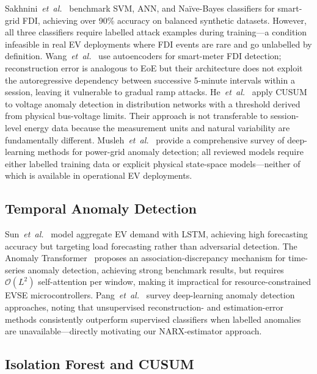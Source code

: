 \documentclass[journal]{IEEEtran}
\begin{document}
Sakhnini~\emph{et~al.}~\cite{sakhnini2019} benchmark SVM, ANN,
and Na\"ive-Bayes classifiers for smart-grid FDI, achieving over
90\% accuracy on balanced synthetic datasets.
However, all three classifiers require labelled attack examples
during training---a condition infeasible in real EV deployments
where FDI events are rare and go unlabelled by definition.
Wang~\emph{et~al.}~\cite{wang2020detection} use autoencoders for
smart-meter FDI detection; reconstruction error is analogous
to EoE but their architecture does not exploit the autoregressive
dependency between successive 5-minute intervals within a session,
leaving it vulnerable to gradual ramp attacks.
He~\emph{et~al.}~\cite{he2020cyber} apply CUSUM to voltage
anomaly detection in distribution networks with a threshold derived
from physical bus-voltage limits.
Their approach is not transferable to session-level energy data
because the measurement units and natural variability are
fundamentally different.
Musleh~\emph{et~al.}~\cite{musleh2019} provide a comprehensive
survey of deep-learning methods for power-grid anomaly detection;
all reviewed models require either labelled training data or
explicit physical state-space models---neither of which is
available in operational EV deployments.

\subsection{Temporal Anomaly Detection}

Sun~\emph{et~al.}~\cite{sun2020charging} model aggregate EV demand
with LSTM, achieving high forecasting accuracy but targeting
load forecasting rather than adversarial detection.
The Anomaly Transformer~\cite{xu2022anomaly} proposes an
association-discrepancy mechanism for time-series anomaly detection,
achieving strong benchmark results, but requires $\mathcal{O}(L^2)$
self-attention per window, making it impractical for resource-constrained
EVSE microcontrollers.
Pang~\emph{et~al.}~\cite{pang2021deep} survey deep-learning
anomaly detection approaches, noting that unsupervised reconstruction-
and estimation-error methods consistently outperform supervised
classifiers when labelled anomalies are unavailable---directly
motivating our NARX-estimator approach.

\subsection{Isolation Forest and CUSUM}
\end{document}
